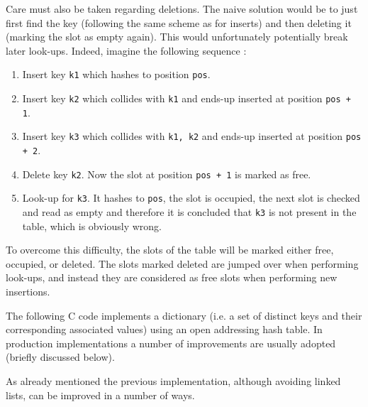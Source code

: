 \documentclass[12pt]{article}
\theoremstyle{plain}
\theoremstyle{remark}
\begin{document}
Care must also be taken regarding deletions. The naive solution would be to just
first find the key (following the same scheme as for inserts) and then deleting
it (marking the slot as empty again). This would unfortunately potentially break
later look-ups. Indeed, imagine the following sequence :
\begin{enumerate}
	\item Insert key {\tt k1} which hashes to position {\tt pos}.
	\item Insert key {\tt k2} which collides with {\tt k1} and ends-up
		inserted at position {\tt pos + 1}.
	\item Insert key {\tt k3} which collides with {\tt k1, k2} and ends-up
		inserted at position {\tt pos + 2}.
	\item Delete key {\tt k2}. Now the slot at position {\tt pos + 1} is
		marked as free.
	\item Look-up for {\tt k3}. It hashes to {\tt pos}, the slot is
		occupied, the next slot is checked and read as empty and
		therefore it is concluded that {\tt k3} is not present in the
		table, which is obviously wrong.
\end{enumerate}

To overcome this difficulty, the slots of the table will be marked either free,
occupied, or deleted. The slots marked deleted are jumped over when performing
look-ups, and instead they are considered as free slots when performing new
insertions.

\medskip

The following C code implements a dictionary (i.e. a set of distinct keys and
their corresponding associated values) using an open addressing hash table. In 
production implementations a number of improvements are usually adopted (briefly 
discussed below).



As already mentioned  the previous implementation, although avoiding linked
lists, can be improved in a number of ways. 
\end{document}
